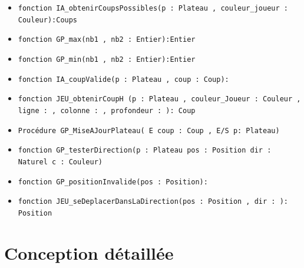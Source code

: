 \documentclass{report}
\begin{document}
\begin{itemize}
         \item{\tt fonction IA\_obtenirCoupsPossibles(p : Plateau , couleur\_joueur : Couleur):Coups}
         \item{\tt fonction GP\_max(nb1 , nb2 : Entier):Entier}
         \item{\tt fonction GP\_min(nb1 , nb2 : Entier):Entier}
         \item{\tt fonction IA\_coupValide(p : Plateau , coup : Coup):\booleen}
         \item{\tt  fonction JEU\_obtenirCoupH (p : Plateau , couleur\_Joueur : Couleur , ligne : \naturel , colonne : \naturel , profondeur : \naturel): Coup}
         \item{\tt Procédure GP\_MiseAJourPlateau( E coup : Coup , E/S p: Plateau)}
          
         \item{\tt fonction GP\_testerDirection(p : Plateau pos : Position dir : Naturel c : Couleur)\booleen}
         \item{\tt fonction GP\_positionInvalide(pos : Position):\booleen}
         \item{\tt fonction JEU\_seDeplacerDansLaDirection(pos : Position , dir : \naturel): Position}
       
        
        \end{itemize}
    \chapter {Conception détaillée}
    
\end{document}
